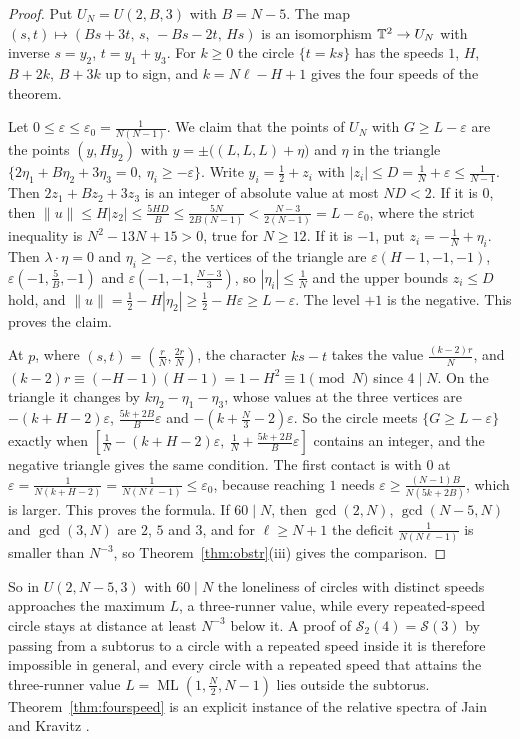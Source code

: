 \documentclass[12pt]{amsart}
\theoremstyle{definition}\newtheorem{definition}[theorem]{Definition}
\theoremstyle{remark}\newtheorem{remark}[theorem]{Remark}
\newcommand{\norm}[1]{\lVert #1\rVert}
\newcommand{\ML}{\operatorname{ML}}
\begin{document}
\begin{proof}
Put $U_N=U(2,B,3)$ with $B=N-5$. The map $(s,t)\mapsto(Bs+3t,\,s,\,-Bs-2t,\,Hs)$ is an isomorphism $\mathbb T^2\to U_N$ with inverse $s=y_2$, $t=y_1+y_3$. For $k\ge0$ the circle $\{t=ks\}$ has the speeds $1$, $H$, $B+2k$, $B+3k$ up to sign, and $k=N\ell-H+1$ gives the four speeds of the theorem.

Let $0\le\varepsilon\le\varepsilon_0=\frac1{N(N-1)}$. We claim that the points of $U_N$ with $G\ge L-\varepsilon$ are the points $(y,Hy_2)$ with $y=\pm\big((L,L,L)+\eta\big)$ and $\eta$ in the triangle $\{2\eta_1+B\eta_2+3\eta_3=0,\ \eta_i\ge-\varepsilon\}$. Write $y_i=\frac12+z_i$ with $|z_i|\le D=\frac1N+\varepsilon\le\frac1{N-1}$. Then $2z_1+Bz_2+3z_3$ is an integer of absolute value at most $ND<2$. If it is $0$, then $\norm u\le H|z_2|\le\frac{5HD}B\le\frac{5N}{2B(N-1)}<\frac{N-3}{2(N-1)}=L-\varepsilon_0$, where the strict inequality is $N^2-13N+15>0$, true for $N\ge12$. If it is $-1$, put $z_i=-\frac1N+\eta_i$. Then $\lambda\cdot\eta=0$ and $\eta_i\ge-\varepsilon$, the vertices of the triangle are $\varepsilon(H-1,-1,-1)$, $\varepsilon(-1,\frac5B,-1)$ and $\varepsilon(-1,-1,\frac{N-3}3)$, so $|\eta_i|\le\frac1N$ and the upper bounds $z_i\le D$ hold, and $\norm u=\frac12-H|\eta_2|\ge\frac12-H\varepsilon\ge L-\varepsilon$. The level $+1$ is the negative. This proves the claim.

At $p$, where $(s,t)=(\frac rN,\frac{2r}N)$, the character $ks-t$ takes the value $\frac{(k-2)r}N$, and $(k-2)r\equiv(-H-1)(H-1)=1-H^2\equiv1\pmod N$ since $4\mid N$. On the triangle it changes by $k\eta_2-\eta_1-\eta_3$, whose values at the three vertices are $-(k+H-2)\varepsilon$, $\frac{5k+2B}B\varepsilon$ and $-(k+\frac N3-2)\varepsilon$. So the circle meets $\{G\ge L-\varepsilon\}$ exactly when $[\frac1N-(k+H-2)\varepsilon,\ \frac1N+\frac{5k+2B}B\varepsilon]$ contains an integer, and the negative triangle gives the same condition. The first contact is with $0$ at $\varepsilon=\frac1{N(k+H-2)}=\frac1{N(N\ell-1)}\le\varepsilon_0$, because reaching $1$ needs $\varepsilon\ge\frac{(N-1)B}{N(5k+2B)}$, which is larger. This proves the formula. If $60\mid N$, then $\gcd(2,N)$, $\gcd(N-5,N)$ and $\gcd(3,N)$ are $2$, $5$ and $3$, and for $\ell\ge N+1$ the deficit $\frac1{N(N\ell-1)}$ is smaller than $N^{-3}$, so Theorem~\ref{thm:obstr}(iii) gives the comparison.
\end{proof}

So in $U(2,N-5,3)$ with $60\mid N$ the loneliness of circles with distinct speeds approaches the maximum $L$, a three-runner value, while every repeated-speed circle stays at distance at least $N^{-3}$ below it. A proof of $\mathcal S_2(4)=\mathcal S(3)$ by passing from a subtorus to a circle with a repeated speed inside it is therefore impossible in general, and every circle with a repeated speed that attains the three-runner value $L=\ML(1,\frac N2,N-1)$ lies outside the subtorus. Theorem~\ref{thm:fourspeed} is an explicit instance of the relative spectra of Jain and Kravitz \cite{JainKravitz}.
\end{document}
